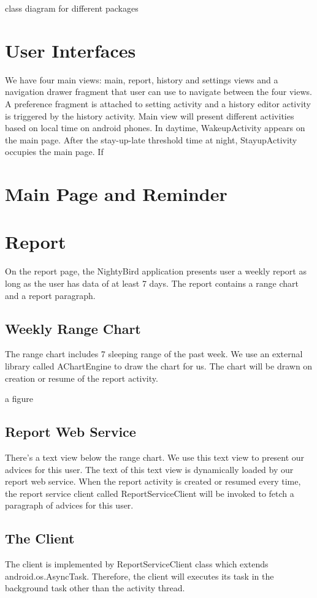 \documentclass[14pt]{extreport}
\begin{document}
class diagram for different packages

\chapter{User Interfaces}
We have four main views: main, report, history and settings views and a navigation drawer fragment that user can use to navigate between the four views. A preference fragment is attached to setting activity and a history editor activity is triggered by the history activity. Main view will present different activities based on local time on android phones. In daytime, WakeupActivity appears on the main page. After the stay-up-late threshold time at night, StayupActivity occupies the main page. If 

\chapter{Main Page and Reminder}

\chapter{Report}
On the report page, the NightyBird application presents user a weekly report as long as the user has data of at least 7 days. The report contains a range chart and a report paragraph.
\section{Weekly Range Chart}
The range chart includes 7 sleeping range of the past week. We use an external library called AChartEngine to draw the chart for us. The chart will be drawn on creation or resume of the report activity.

a figure

\section{Report Web Service}
There's a text view below the range chart. We use this text view to present our advices for this user. The text of this text view is dynamically loaded by our report web service. When the report activity is created or resumed every time, the report service client called ReportServiceClient will be invoked to fetch a paragraph of advices for this user. 

\section{The Client}
The client is implemented by ReportServiceClient class which extends android.os.AsyncTask. Therefore, the client will executes its task in the background task other than the activity thread.
\end{document}
